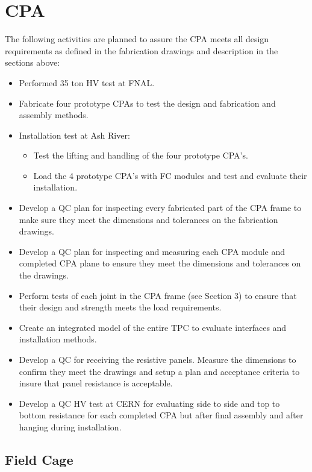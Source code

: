 \section{CPA}

The following activities are planned to assure the CPA meets all design requirements as defined in the fabrication drawings and description in the sections above:
\begin{itemize}
\item Performed 35 ton HV test at FNAL.
\item Fabricate four prototype CPAs to test the design and fabrication and assembly methods.
\item Installation test at Ash River:
\begin{itemize}
\item Test the lifting and handling of the four prototype CPA's.
\item  Load the 4 prototype CPA's with FC modules and test and evaluate their installation.
\end{itemize}
\item Develop a QC plan for inspecting every fabricated part of the CPA frame to make sure they meet the dimensions and tolerances on the fabrication drawings.
\item Develop a QC plan for inspecting and measuring each CPA module and completed CPA plane to ensure they meet the dimensions and tolerances on the drawings.
\item Perform tests of each joint in the CPA frame (see Section 3) to ensure that their design and strength meets the load requirements.
\item Create an integrated model of the entire TPC to evaluate interfaces and installation methods.  
\item Develop a QC for receiving the resistive panels.  Measure the dimensions to confirm they meet the drawings and setup a plan and acceptance criteria to insure that panel resistance is acceptable.
\item Develop a QC  HV test at CERN for evaluating side to side and top to bottom resistance for each completed CPA but after final assembly and after hanging during installation.  
\end{itemize}

\subsection{Field Cage}

